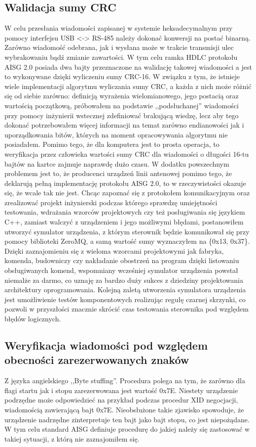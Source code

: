     \subsection{Walidacja sumy CRC}
    W celu przesłania wiadomości zapisanej w systemie heksadecymalnym przy pomocy interfejsu USB <-> RS-485
    należy dokonać konwersji na postać binarną. Zarówno wiadomość odebrana, jak i wysłana może w trakcie transmisji ulec wybrakowaniu bądź
    zmianie zawartości. W tym celu ramka HDLC protokołu AISG 2.0 posiada dwa bajty przeznaczone na walidację takowej wiadomości a jest to wykonywane
    dzięki wyliczeniu sumy CRC-16. W związku z tym, że istnieje wiele implementacji algorytmu wyliczania sumy CRC, a każda z nich może różnić się od siebie zarówno:
    definicją wyrażenia wielomianowego, jego postacią oraz wartością początkową, próbowałem na podstawie ,,podsłuchanej'' wiadomości przy pomocy
    inżynierii wstecznej zdefiniować brakującą wiedzę, lecz aby tego dokonać potrzebowałem więcej informacji na temat zarówno endianowości
    jak i uporządkowania bitów, których na moment opracowywania algorytmu nie posiadałem. Pomimo tego, że dla komputera jest to prosta operacja, to weryfikacja przez człowieka
    wartości sumy CRC dla wiadomości o długości 16-tu bajtów na kartce zajmuje naprawdę dużo czasu. W dodatku powszechnym problemem jest to, że 
    producenci urządzeń linii antenowej pomimo tego, że deklarują pełną implementację protokołu AISG 2.0, to w rzeczywistości okazuje się, że
    wcale tak nie jest. Chcąc zapoznać się z protokołem komunikacyjnym oraz zrealizować projekt inżynierski podczas którego sprawdzę umiejętności testowania,
    wdrażania wzorców projektowych czy też posługiwania się językiem C++, zamiast walczyć z urządzeniem i jego możliwymi błędami, postanowiłem
    utworzyć symulator urządzenia, z którym sterownik będzie komunikował się przy pomocy biblioteki ZeroMQ, a samą wartość sumy wyznaczyłem na \{0x13, 0x37\}. 
    Dzięki zaznajomieniu się z wieloma wzorcami projektowymi jak fabryka, komenda, budowniczy czy nakładanie obostrzeń na program dzięki listowaniu obsługiwanych komend, 
    wspomniany wcześniej symulator urządzenia powstał niemalże za darmo, co uznaję za bardzo duży sukces z dziedziny projektowania architektury oprogramowania.
    Kolejną zaletą utworzenia symulatora urządzenia jest umożliwienie testów komponentowych realizując regułę czarnej skrzynki, co pozwoli w przyszłości
    znacznie skrócić czas testowania sterownika pod względem błędów logicznych.
    \subsection{Weryfikacja wiadomości pod względem obecności zarezerwowanych znaków}
    Z języka angielskiego ,,Byte stuffing''. Procedura polega na tym, że zarówno dla flagi startu jak i stopu zarezerwowana jest wartość 0x7E.
    Niestety urządzenie podrzędne może odpowiedzieć na przykład podczas procedur XID negocjacji, wiadomością zawierającą bajt 0x7E. Nieobsłużone
    takie zjawisko spowoduje, że urządzenie nadrzędne zinterpretuje ten bajt jako bajt stopu, co jest niepożądane\cite{ISO-IEC-13239}. W tym celu standard AISG 
    definiuje procedurę do jakiej należy się zastosować w takiej sytuacji, z którą nie zaznajomiłem się.
